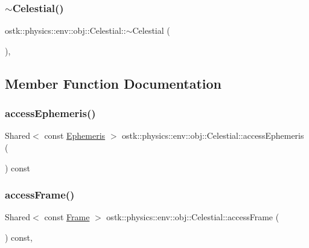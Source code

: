 \subsubsection{\texorpdfstring{$\sim$\+Celestial()}{~Celestial()}}
{\footnotesize\ttfamily ostk\+::physics\+::env\+::obj\+::\+Celestial\+::$\sim$\+Celestial (\begin{DoxyParamCaption}{ }\end{DoxyParamCaption})\hspace{0.3cm}{\ttfamily [override]}, {\ttfamily [virtual]}}



\subsection{Member Function Documentation}
\mbox{\label{classostk_1_1physics_1_1env_1_1obj_1_1_celestial_a381edd898ce5b55e533a250a8212cf1b}} 
\subsubsection{\texorpdfstring{access\+Ephemeris()}{accessEphemeris()}}
{\footnotesize\ttfamily Shared$<$ const \hyperlink{classostk_1_1physics_1_1env_1_1_ephemeris}{Ephemeris} $>$ ostk\+::physics\+::env\+::obj\+::\+Celestial\+::access\+Ephemeris (\begin{DoxyParamCaption}{ }\end{DoxyParamCaption}) const}

\mbox{\label{classostk_1_1physics_1_1env_1_1obj_1_1_celestial_a0140fc682a707ec2dc715828e532db79}} 
\subsubsection{\texorpdfstring{access\+Frame()}{accessFrame()}}
{\footnotesize\ttfamily Shared$<$ const \hyperlink{classostk_1_1physics_1_1coord_1_1_frame}{Frame} $>$ ostk\+::physics\+::env\+::obj\+::\+Celestial\+::access\+Frame (\begin{DoxyParamCaption}{ }\end{DoxyParamCaption}) const\hspace{0.3cm}{\ttfamily [override]}, {\ttfamily [virtual]}}



